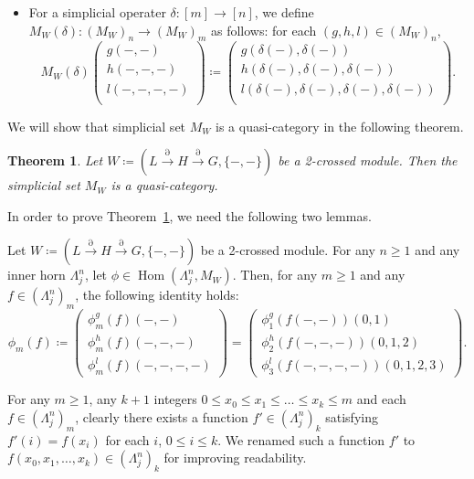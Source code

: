 \documentclass{tac}
\newtheorem{theorem}{Theorem}
\begin{document}
\begin{itemize}
\item For a simplicial operater $\delta : [m] \rightarrow [n]$, we define $M_W(\delta): (M_W)_n \rightarrow (M_W)_m$ as follows: for each $(g,h,l) \in (M_W)_n$, %
\[
M_W(\delta)
\begin{pmatrix}
g(-,-)\\
h(-,-,-)\\
l(-,-,-,-)\\
\end{pmatrix}
\coloneqq
\begin{pmatrix}
g(\delta(-),\delta(-))\\
h(\delta(-),\delta(-),\delta(-))\\
l(\delta(-),\delta(-),\delta(-),\delta(-))\\
\end{pmatrix}
.\]
\end{itemize}

\noindent
We will show that simplicial set $M_W$ is a quasi-category in the following theorem.

\begin{theorem}\label{2cm and qusi}
Let $W \coloneqq (L \xrightarrow{\partial} H \xrightarrow{\partial} G,\{-,-\} )$ be a 2-crossed module. Then the simplicial set $M_W$ is a quasi-category.
\end{theorem}


In order to prove Theorem~\ref{2cm and qusi}, we need the following two lemmas.

\begin{lemma}
\label{lemma1}
Let \( W \coloneqq (L \xrightarrow{\partial} H \xrightarrow{\partial} G, \{-,-\}) \) be a 2-crossed module. For any \( n \ge 1 \) and any inner horn \( \Lambda^n_j \), let \( \phi \in \operatorname{Hom}(\Lambda^n_j, M_W) \). Then, for any \( m \ge 1 \) and any \( f \in (\Lambda^n_j)_m \), the following identity holds:
\[
\phi_m(f) 
\coloneqq
\begin{pmatrix}
\phi^g_m(f)(-,-) \\
\phi^h_m(f)(-,-,-) \\
\phi^l_m(f)(-,-,-,-)
\end{pmatrix}
=
\begin{pmatrix}
\phi^g_1(f(-,-))(0,1) \\
\phi^h_2(f(-,-,-))(0,1,2) \\
\phi^l_3(f(-,-,-,-))(0,1,2,3)
\end{pmatrix}.
\]
\end{lemma}

For any $m\ge 1$, any $k+1$ integers  \( 0\le x_0 \le x_1 \le \dots \le x_k \le m\)
and
each \( f \in (\Lambda^n_j)_m \),
clearly there exists a function \(f' \in (\Lambda^n_j)_k \) 
satisfying $f'(i) = f(x_i)$ for each $i$, $0\leq i\leq k$.
We renamed such a function $f'$ to  \( f(x_0, x_1, \dots, x_k) \in (\Lambda^n_j)_k \) 
for improving readability.
\end{document}
